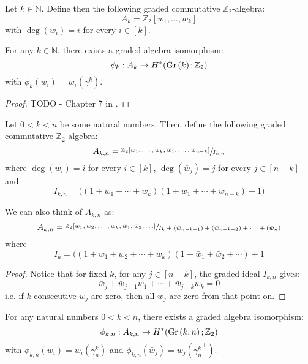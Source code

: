 \begin{definition} Let $k\in\mathbb{N}$. Define then the following graded commutative $\mathbb{Z}_2$-algebra:
\[A_k=\mathbb{Z}_2[w_1,\ldots,w_k]\]
with $\deg(w_i)=i$ for every $i\in[k]$.
\end{definition}
\begin{theorem} For any $k\in\mathbb{N}$, there exists a graded algebra isomorphism:
\[\phi_k:A_k\to H^*(\Gr{k};\mathbb{Z}_2)\]
with $\phi_k(w_i)=w_i(\gamma^k)$.
\end{theorem}
\begin{proof} TODO - Chapter 7 in \cite{char_class}.
\end{proof}
\begin{definition} Let $0<k<n$ be some natural numbers. Then, define the following graded commutative $\mathbb{Z}_2$-algebra:
\[A_{k,n}=\sfrac{\mathbb{Z}_2[w_1,\ldots,w_k,\bar{w}_1,\ldots,\bar{w}_{n-k}]}{I_{k,n}}\]
where $\deg(w_i)=i$ for every $i\in[k]$, $\deg(\bar{w}_j)=j$ for every $j\in[n-k]$ and
\[I_{k,n}=\big((1+w_1+\cdots+w_k)(1+\bar{w}_1+\cdots+\bar{w}_{n-k})+1\big)\]
\end{definition}
\begin{proposition} We can also think of $A_{k,n}$ as:
\[A_{k,n}=\sfrac{\mathbb{Z}_2[w_1,w_2,\ldots,w_k,\bar{w}_1,\bar{w}_2,\ldots]}{I_k+(\bar{w}_{n-k+1})+(\bar{w}_{n-k+2})+\cdots+(\bar{w}_{n})}\]
where
\[I_k=\big((1+w_1+w_2+\cdots+w_k)(1+\bar{w}_1+\bar{w}_2+\cdots)+1\]
\end{proposition}
\begin{proof} Notice that for fixed $k$, for any $j\in[n-k]$, the graded ideal $I_{k,n}$ gives:
\[\bar{w}_j+\bar{w}_{j-1}w_1+\cdots+\bar{w}_{j-k}w_k=0\]
i.e. if $k$ consecutive $\bar{w}_j$ are zero, then all $\bar{w}_j$ are zero from that point on.
\end{proof}
\begin{theorem} For any natural numbers $0<k<n$, there exists a graded algebra isomorphism:
\[\phi_{k,n}:A_{k,n}\to H^*(\Gr{k}{n};\mathbb{Z}_2)\]
with $\phi_{k,n}(w_i)=w_i(\gamma^k_n)$ and $\phi_{k,n}(\bar{w}_j)=w_j({\gamma^k_n}^{\perp})$.
\end{theorem}
